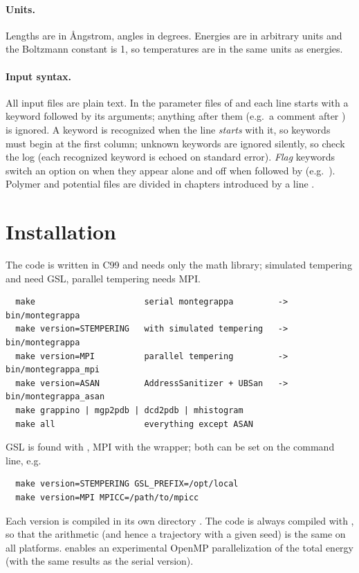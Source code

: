 \documentclass[11pt,a4paper]{article}
\begin{document}
\paragraph{Units.} Lengths are in \AA{}ngstrom, angles in degrees.
Energies are in arbitrary units and the Boltzmann constant is 1, so
temperatures are in the same units as energies.

\paragraph{Input syntax.} All input files are plain text. In the parameter
files of  and  each line starts with a keyword
followed by its arguments; anything after them (e.g.\ a comment after
\kw{#}) is ignored. A keyword is recognized when the line \emph{starts}
with it, so keywords must begin at the first column; unknown keywords are
ignored silently, so check the log (each recognized keyword is echoed on
standard error). \emph{Flag} keywords switch an option on when they appear
alone and off when followed by  (e.g.\ ). Polymer and
potential files are divided in chapters introduced by a line
\kw{[ name ]}.

\section{Installation}

The code is written in C99 and needs only the math library; simulated
tempering and  need GSL, parallel tempering needs MPI.
\begin{Verbatim}
  make                      serial montegrappa         -> bin/montegrappa
  make version=STEMPERING   with simulated tempering   -> bin/montegrappa
  make version=MPI          parallel tempering         -> bin/montegrappa_mpi
  make version=ASAN         AddressSanitizer + UBSan   -> bin/montegrappa_asan
  make grappino | mgp2pdb | dcd2pdb | mhistogram
  make all                  everything except ASAN
\end{Verbatim}
GSL is found with , MPI with the  wrapper; both can
be set on the command line, e.g.
\begin{Verbatim}
  make version=STEMPERING GSL_PREFIX=/opt/local
  make version=MPI MPICC=/path/to/mpicc
\end{Verbatim}
Each
version is compiled in its own directory . The code is
always compiled with , so that the arithmetic (and
hence a trajectory with a given seed) is the same on all platforms.
 enables an experimental OpenMP parallelization of the
total energy (with the same results as the serial version).
\end{document}

